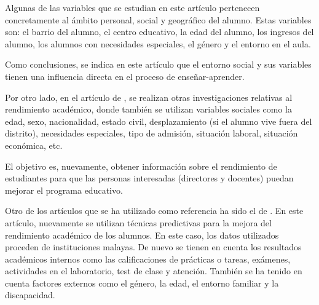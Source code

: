 Algunas de las variables que se estudian en este artículo pertenecen concretamente al ámbito personal, social y geográfico del alumno. Estas variables son: el barrio del alumno, el centro educativo, la edad del alumno, los ingresos del alumno, los alumnos con necesidades especiales, el género y el entorno en el aula.

Como conclusiones, se indica en este artículo que el entorno social y sus variables tienen una influencia directa en el proceso de enseñar-aprender. %

Por otro lado, en el artículo de , se realizan otras investigaciones relativas al rendimiento académico, donde también se utilizan variables sociales como la edad, sexo, nacionalidad, estado civil, desplazamiento (si el alumno vive fuera del distrito), necesidades especiales, tipo de admisión, situación laboral, situación económica, etc.


El objetivo es, nuevamente, obtener información sobre el rendimiento de estudiantes para que las personas interesadas (directores y docentes) puedan mejorar el programa educativo. %

Otro de los artículos que se ha utilizado como referencia ha sido el de . En este artículo, nuevamente se utilizan técnicas predictivas para la mejora del rendimiento académico de los alumnos. En este caso, los datos utilizados proceden de instituciones malayas. De nuevo se tienen en cuenta los resultados académicos internos como las calificaciones de prácticas o tareas, exámenes, actividades en el laboratorio, test de clase y atención. También se ha tenido en cuenta factores externos como el género, la edad, el entorno familiar y la discapacidad. 

